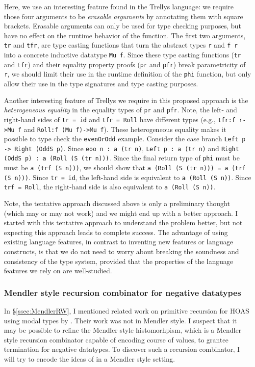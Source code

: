 Here, we use an interesting feature found in the Trellys language:
we require those four arguments to be \emph{erasable arguments}
by annotating them with square brackets. Erasable arguments can only be
used for type checking purposes, but have no effect on the runtime behavior
of the function.  The first two arguments,
\verb|tr| and \verb|tfr|, are type casting functions that turn the abstract
types \verb|r| and \verb|f r| into a concrete inductive datatype \verb|Mu f|.
Since these type casting functions (\verb|tr| and \verb|tfr|) and
their equality property proofs (\verb|pr| and \verb|pfr|) break parametricity
of \verb|r|, we should limit their use in the runtime definition of
the \verb|phi| function, but only allow their use in the type signatures
and type casting purposes.

Another interesting feature of Trellys we require in this proposed approach
is the \emph{heterogeneous equality} in the equality types of \verb|pr| and
\verb|pfr|.
Note, the left- and right-hand sides of \verb|tr = id| and \verb|tfr = Roll|
have different types (e.g., \texttt{tfr:f r->Mu f} and
\texttt{Roll:f (Mu f)->Mu f}). 
These heterogeneous equality makes it possible to type check the
\verb|evenOrOdd| example.  Consider the case branch
\verb|Left p -> Right (OddS p)|.  Since \verb|eoo n : a (tr n)|,
\texttt{Left p : a (tr n)} and \verb|Right (OddS p) : a (Roll (S (tr n)))|.
Since the final return type of \verb|phi| must be must be \verb|a (trf (S n)))|,
we should show that \texttt{a (Roll (S (tr n))) = a (trf (S n)))}.
Since \verb|tr = id|, the left-hand side is equivalent to \verb|a (Roll (S n))|.
Since \verb|trf = Roll|, the right-hand side is also equivalent to
\verb|a (Roll (S n))|.

Note, the tentative approach discussed above is only a preliminary thought
(which may or may not work) and we might end up with a better approach.
I started with this tentative approach to understand the problem better,
but not expecting this approach leads to complete success. The advantage
of using existing language features, in contrast to inventing new features
or language constructs, is that we do not need to worry about breaking the
soundness and consistency of the type system, provided that the properties
of the language features we rely on are well-studied.

\subsubsection{Mendler style recursion combinator for negative datatypes}
\label{sec:plan:recneg}
In \S\ref{ssec:MendlerRW}, I mentioned related work on primitive recursion
for HOAS using modal types by \citet{DesPfeSch97,DesLel99}. Their work was
not in Mendler style. I suspect that it may be possible to refine
the Mendler style histomorhpism, which is a Mendler style recursion combinator
capable of encoding course of values, to grantee termination for
negative datatypes. To discover such a recursion combinator, I will try to
encode the ideas of \citet{DesPfeSch97} in a Mendler style setting.

